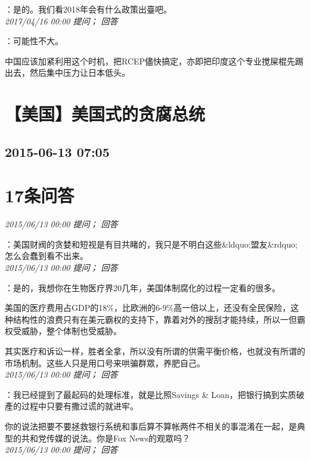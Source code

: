 \documentclass[twocolumn]{ctexart}
\begin{document}
：是的。我们看2018年会有什么政策出臺吧。\\

\textit{\hfill\noindent\small 2017/04/16 00:00 提问； 回答}

：可能性不大。

中国应该加紧利用这个时机，把RCEP儘快搞定，亦即把印度这个专业搅屎棍先踢出去，然后集中压力让日本低头。\\


\section{【美国】美国式的贪腐总统}
\subsection{2015-06-13 07:05}


\section{17条问答}

\textit{\hfill\noindent\small 2015/06/13 00:00 提问； 回答}

：美国财阀的贪婪和短视是有目共睹的，我只是不明白这些\&ldquo;盟友\&rdquo;怎么会蠢到看不出来。\\

\textit{\hfill\noindent\small 2015/06/13 00:00 提问； 回答}

：是的，我想你在生物医疗界20几年，美国体制腐化的过程一定看的很多。

美国的医疗费用占GDP的18\%，比欧洲的6-9\%高一倍以上，还没有全民保险，这种结构性的浪费只有在美元霸权的支持下，靠着对外的搜刮才能持续，所以一但霸权受威胁，整个体制也受威胁。

其实医疗和诉讼一样，胜者全拿，所以没有所谓的供需平衡价格，也就没有所谓的市场机制。这些人只是用口号来哄骗群眾，养肥自己。\\

\textit{\hfill\noindent\small 2015/06/13 00:00 提问； 回答}

：我已经提到了最起码的处理标准，就是比照Savings \& Loan，把银行搞到实质破產的过程中只要有撒过谎的就进牢。

你的说法把要不要拯救银行系统和事后算不算帐两件不相关的事混淆在一起，是典型的共和党传媒的说法。你是Fox News的观眾吗？\\

\textit{\hfill\noindent\small 2015/06/13 00:00 提问； 回答}
\end{document}

